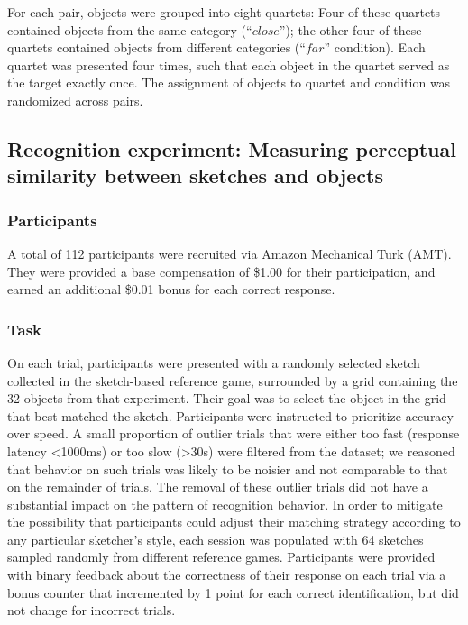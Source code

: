 \documentclass[9pt,twocolumn,twoside]{pnas-new}
\begin{document}
{For each pair, objects were grouped into eight quartets: Four of these quartets contained objects from the same category (``$close$''); the other four of these quartets contained objects from different categories (``$far$'' condition). Each quartet was presented four times, such that each object in the quartet served as the target exactly once. The assignment of objects to quartet and condition was randomized across pairs.

\subsection*{Recognition experiment: Measuring perceptual similarity between sketches and objects}

\subsubsection*{Participants}

A total of 112 participants were recruited via Amazon Mechanical Turk (AMT). They were provided a base compensation of \$1.00 for their participation, and earned an additional \$0.01 bonus for each correct response.

\subsubsection*{Task}

On each trial, participants were presented with a randomly selected sketch collected in the sketch-based reference game, surrounded by a grid containing the 32 objects from that experiment. Their goal was to select the object in the grid that best matched the sketch. Participants were instructed to prioritize accuracy over speed. A small proportion of outlier trials that were either too fast (response latency <1000ms) or too slow (>30s) were filtered from the dataset; we reasoned that behavior on such trials was likely to be noisier and not comparable to that on the remainder of trials. The removal of these outlier trials did not have a substantial impact on the pattern of recognition behavior. In order to mitigate the possibility that participants could adjust their matching strategy according to any particular sketcher's style, each session was populated with 64 sketches sampled randomly from different reference games. Participants were provided with binary feedback about the correctness of their response on each trial via a bonus counter that incremented by 1 point for each correct identification, but did not change for incorrect trials.

}
\end{document}
